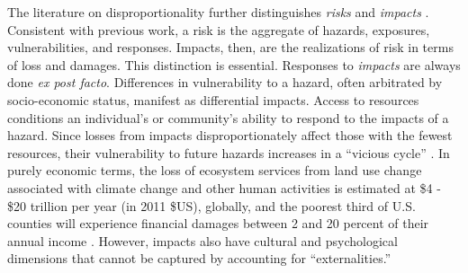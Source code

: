     The literature on disproportionality further distinguishes \textit{risks} and \textit{impacts} \cite{dorkenoo_critical_2022}. Consistent with previous work, a risk is the aggregate of hazards,
    exposures, vulnerabilities, and responses. Impacts, then, are the realizations of risk in terms of loss and damages. This distinction is essential. Responses to \textit{impacts} are always done \textit{ex post facto}. Differences in vulnerability to a hazard, often arbitrated by 
    socio-economic status, manifest as differential impacts. Access to resources conditions an 
    individual's or community's ability to respond to the impacts of a hazard. Since losses from impacts disproportionately affect those with the fewest resources, their vulnerability to future
    hazards increases in a ``vicious cycle'' \cite{islam_climate_2017, dorkenoo_critical_2022}.
    In purely economic terms, the loss of ecosystem services from land use change associated with climate change and other human activities is estimated at \$4 - \$20 trillion per year (in 2011 \$US), globally, \cite{costanza_changes_2014} and the poorest third of U.S. counties will experience financial damages between 2 and 20 percent of their annual income \cite{hsiang_estimating_2017}. However, impacts also have cultural and psychological dimensions \cite{dorkenoo_critical_2022} that cannot be captured by accounting for ``externalities.''
    
\noindent\hrulefill


